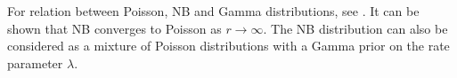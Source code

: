 For relation between Poisson, \gls{NB} and Gamma distributions, see \cite{barry2020gamma}. It can be shown that \gls{NB} converges to Poisson as $r \to \infty$. The \gls{NB} distribution can also be considered as a mixture of Poisson distributions with a Gamma prior on the rate parameter $\lambda$.
    
    
    
    
    
    

    


